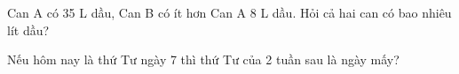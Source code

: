 \begin{ex} %
Can A có 35 L dầu, Can B có ít hơn Can A 8 L dầu. Hỏi cả hai can có bao nhiêu lít dầu?
\end{ex}

\begin{ex} %
Nếu hôm nay là thứ Tư ngày 7 thì thứ Tư của 2 tuần sau là ngày mấy?
\end{ex}
